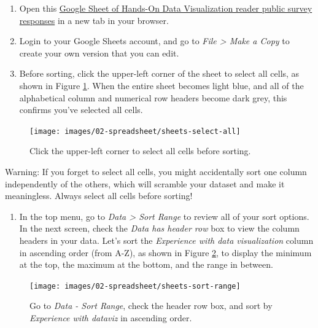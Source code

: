 \documentclass[
  english,
]{book}
\providecommand{\tightlist}{%
  \setlength{\itemsep}{0pt}\setlength{\parskip}{0pt}}
\begin{document}
\begin{enumerate}
\def\labelenumi{\arabic{enumi}.}
\item
  Open this \href{https://docs.google.com/spreadsheets/d/1egX_akJccnCSzdk1aaDdtrEGe5HcaTrlOW-Yf6mJ3Uo}{Google Sheet of Hands-On Data Visualization reader public survey responses} in a new tab in your browser.
\item
  Login to your Google Sheets account, and go to \emph{File \textgreater{} Make a Copy} to create your own version that you can edit.
\item
  Before sorting, click the upper-left corner of the sheet to select all cells, as shown in Figure \ref{fig:sheets-select-all}. When the entire sheet becomes light blue, and all of the alphabetical column and numerical row headers become dark grey, this confirms you've selected all cells.
\end{enumerate}



\begin{figure}
\texttt{[image: images/02-spreadsheet/sheets-select-all]} \caption{Click the upper-left corner to select all cells before sorting.}\label{fig:sheets-select-all}
\end{figure}

Warning: If you forget to select all cells, you might accidentally sort one column independently of the others, which will scramble your dataset and make it meaningless. Always select all cells before sorting!

\begin{enumerate}
\def\labelenumi{\arabic{enumi}.}
\setcounter{enumi}{3}
\tightlist
\item
  In the top menu, go to \emph{Data \textgreater{} Sort Range} to review all of your sort options. In the next screen, check the \emph{Data has header row} box to view the column headers in your data. Let's sort the \emph{Experience with data visualization} column in ascending order (from A-Z), as shown in Figure \ref{fig:sheets-sort-range}, to display the minimum at the top, the maximum at the bottom, and the range in between.
\end{enumerate}



\begin{figure}
\texttt{[image: images/02-spreadsheet/sheets-sort-range]} \caption{Go to \emph{Data - Sort Range}, check the header row box, and sort by \emph{Experience with dataviz} in ascending order.}\label{fig:sheets-sort-range}
\end{figure}
\end{document}
